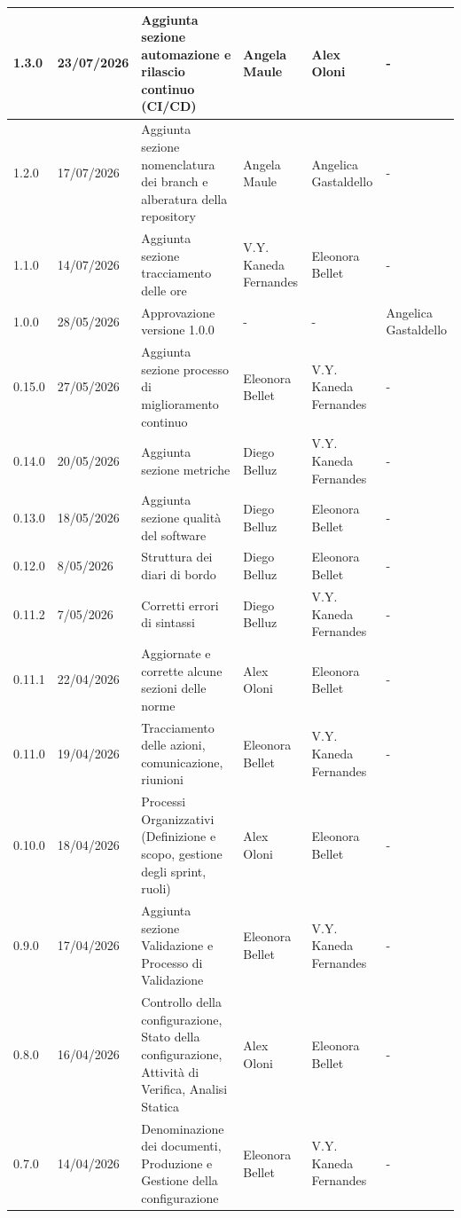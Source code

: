 \documentclass[a4paper,12pt]{article}
\begin{document}
{\begin{longtable}{|p{1.1cm}|p{2.0cm}|p{4.3cm}|p{2.8cm}|p{2.0cm}|p{2.0cm}|}
        \hline
        1.3.0 & 23/07/2026 & Aggiunta sezione automazione e rilascio continuo (CI/CD) & Angela Maule & Alex Oloni & - \\
        \hline
        1.2.0 & 17/07/2026 & Aggiunta sezione nomenclatura dei branch e alberatura della repository & Angela Maule & Angelica Gastaldello & - \\
        \hline
        1.1.0 & 14/07/2026 & Aggiunta sezione tracciamento delle ore & V.Y. Kaneda Fernandes & Eleonora Bellet & - \\
        \hline
        1.0.0 & 28/05/2026 & Approvazione versione 1.0.0 & - & - & Angelica Gastaldello \\
        \hline
        0.15.0 & 27/05/2026 & Aggiunta sezione processo di miglioramento continuo & Eleonora Bellet & V.Y. Kaneda Fernandes & - \\
        \hline
        0.14.0 & 20/05/2026 & Aggiunta sezione metriche & Diego Belluz & V.Y. Kaneda Fernandes & - \\
        \hline 
        0.13.0 & 18/05/2026 & Aggiunta sezione qualità del software & Diego Belluz & Eleonora Bellet & - \\
        \hline 
        0.12.0 & 8/05/2026 & Struttura dei diari di bordo & Diego Belluz & Eleonora Bellet & - \\
        \hline
        0.11.2 & 7/05/2026 & Corretti errori di sintassi & Diego Belluz & V.Y. Kaneda Fernandes & - \\
        \hline 
        0.11.1 & 22/04/2026 & Aggiornate e corrette alcune sezioni delle norme & Alex Oloni & Eleonora Bellet & - \\
        \hline 
        0.11.0 & 19/04/2026 & Tracciamento delle azioni, comunicazione, riunioni & Eleonora Bellet & V.Y. Kaneda Fernandes & - \\
        \hline
        0.10.0 & 18/04/2026 & Processi Organizzativi (Definizione e scopo, gestione degli sprint, ruoli) & Alex Oloni & Eleonora Bellet & - \\
        \hline 
        0.9.0 & 17/04/2026 & Aggiunta sezione Validazione e Processo di Validazione & Eleonora Bellet & V.Y. Kaneda Fernandes & - \\
        \hline 
        0.8.0 & 16/04/2026 & Controllo della configurazione, Stato della configurazione, Attività di Verifica, Analisi Statica & Alex Oloni & Eleonora Bellet & - \\
        \hline
        0.7.0 & 14/04/2026 & Denominazione dei documenti, Produzione e Gestione della configurazione & Eleonora Bellet & V.Y. Kaneda Fernandes & - \\

\end{longtable}}
\end{document}
